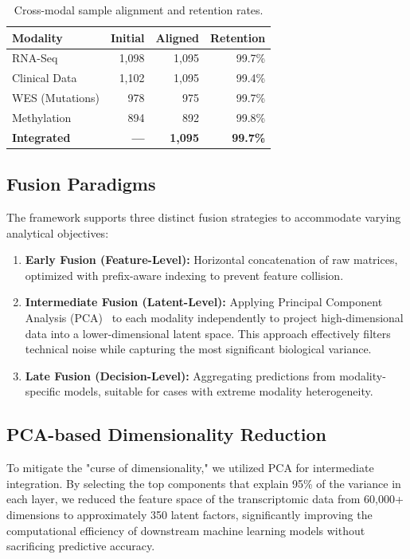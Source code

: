 \documentclass[sigconf,nonacm]{acmart}
\begin{document}
\begin{table}[h]
\caption{Cross-modal sample alignment and retention rates.}\label{tab:alignment}
\centering
\small
\renewcommand{\arraystretch}{1.2}
\begin{tabularx}{\columnwidth}{l r r r}
\toprule
\rowcolor{headergray} \textbf{Modality} & \textbf{Initial} & \textbf{Aligned} & \textbf{Retention} \\
\midrule
RNA-Seq         & 1,098 & 1,095 & 99.7\% \\
Clinical Data   & 1,102 & 1,095 & 99.4\% \\
WES (Mutations) & 978   & 975   & 99.7\% \\
Methylation     & 894   & 892   & 99.8\% \\
\midrule
\rowcolor{headergray!50} \textbf{Integrated} & \textbf{---} & \textbf{1,095} & \textbf{99.7\%} \\
\bottomrule
\end{tabularx}
\end{table}

\subsection{Fusion Paradigms}
The framework supports three distinct fusion strategies to accommodate varying analytical objectives:
\begin{enumerate}
    \item \textbf{Early Fusion (Feature-Level):} Horizontal concatenation of raw matrices, optimized with prefix-aware indexing to prevent feature collision.
    \item \textbf{Intermediate Fusion (Latent-Level):} Applying Principal Component Analysis (PCA)~\cite{jolliffe2002} to each modality independently to project high-dimensional data into a lower-dimensional latent space. This approach effectively filters technical noise while capturing the most significant biological variance.
    \item \textbf{Late Fusion (Decision-Level):} Aggregating predictions from modality-specific models, suitable for cases with extreme modality heterogeneity.
\end{enumerate}

\subsection{PCA-based Dimensionality Reduction}
To mitigate the "curse of dimensionality," we utilized PCA for intermediate integration. By selecting the top components that explain 95\% of the variance in each layer, we reduced the feature space of the transcriptomic data from 60,000+ dimensions to approximately 350 latent factors, significantly improving the computational efficiency of downstream machine learning models without sacrificing predictive accuracy.
\end{document}

